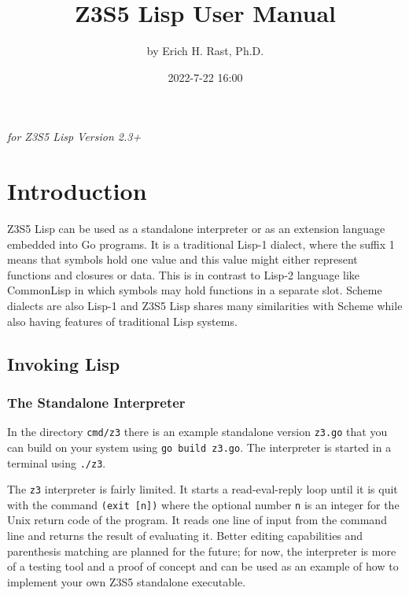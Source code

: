 \documentclass[
]{article}
\title{Z3S5 Lisp User Manual}
\author{by Erich H. Rast, Ph.D.}
\date{2022-7-22 16:00}
\newcommand{\passthrough}[1]{#1}
\begin{document}
\maketitle

\emph{for Z3S5 Lisp Version 2.3+}

\hypertarget{introduction}{%
\section{Introduction}\label{introduction}}

Z3S5 Lisp can be used as a standalone interpreter or as an extension
language embedded into Go programs. It is a traditional Lisp-1 dialect,
where the suffix 1 means that symbols hold one value and this value
might either represent functions and closures or data. This is in
contrast to Lisp-2 language like CommonLisp in which symbols may hold
functions in a separate slot. Scheme dialects are also Lisp-1 and Z3S5
Lisp shares many similarities with Scheme while also having features of
traditional Lisp systems.

\hypertarget{invoking-lisp}{%
\subsection{Invoking Lisp}\label{invoking-lisp}}

\hypertarget{the-standalone-interpreter}{%
\subsubsection{The Standalone
Interpreter}\label{the-standalone-interpreter}}

In the directory \passthrough{\lstinline!cmd/z3!} there is an example
standalone version \passthrough{\lstinline!z3.go!} that you can build on
your system using \passthrough{\lstinline!go build z3.go!}. The
interpreter is started in a terminal using
\passthrough{\lstinline!./z3!}.

The \passthrough{\lstinline!z3!} interpreter is fairly limited. It
starts a read-eval-reply loop until it is quit with the command
\passthrough{\lstinline!(exit [n])!} where the optional number
\passthrough{\lstinline!n!} is an integer for the Unix return code of
the program. It reads one line of input from the command line and
returns the result of evaluating it. Better editing capabilities and
parenthesis matching are planned for the future; for now, the
interpreter is more of a testing tool and a proof of concept and can be
used as an example of how to implement your own Z3S5 standalone
executable.
\end{document}
